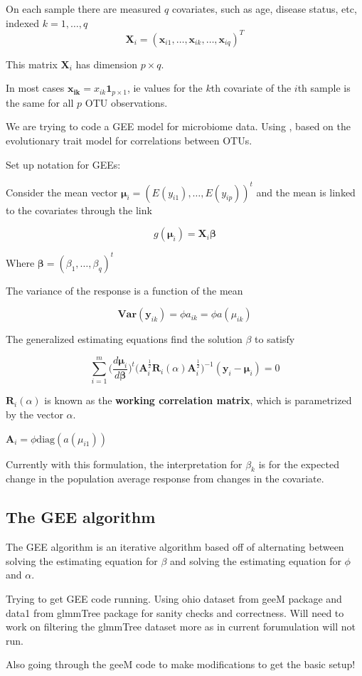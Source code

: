 \documentclass[10pt]{article}
\begin{document}
On each sample there are measured $q$ covariates, such as age, disease status, etc, indexed $k = 1, \ldots, q$
$$\mathbf{X}_i = (\mathbf{x}_{i1}, \ldots, \mathbf{x}_{ik}, \ldots , \mathbf{x}_{iq})^T$$

This matrix $\mathbf{X}_i$ has dimension $p \times q$.

In most cases $\mathbf{x_{ik}} = x_{ik}\boldsymbol{1}_{p \times 1}$, ie values for the $k$th covariate of the $i$th sample is the same for all $p$ OTU observations.


We are trying to code a GEE model for microbiome data. Using \cite{Xiao2018}, based on the evolutionary trait model for correlations between OTUs.


Set up notation for GEEs:

Consider the mean vector $\boldsymbol\mu_i = (E(y_{i1}), \ldots , E(y_{ip}))^t$ and the mean is linked to the covariates through the link

$$g(\boldsymbol\mu_i ) = \mathbf{X}_i \boldsymbol\beta$$

Where $\boldsymbol\beta = (\beta_1 , \ldots , \beta_q)^t$

The variance of the response is a function of the mean

$$\textbf{Var}(\mathbf{y}_{ik}) = \phi a_{ik} = \phi a(\mu_{ik})$$


The generalized estimating equations find the solution $\beta $ to satisfy

$$\sum_{i = 1}^m \bigg(\frac{d \boldsymbol\mu_i}{d \boldsymbol\beta}\bigg)^t \bigg(\mathbf{A}_i^{\frac{1}{2}} \mathbf{R}_i(\alpha) \mathbf{A}_i^{\frac{1}{2}}\bigg)^{-1}(\mathbf{y}_i - \boldsymbol\mu_i) = 0$$


$\mathbf{R}_i(\alpha)$ is known as the \textbf{working correlation matrix}, which is parametrized by the vector $\alpha$.

$\mathbf{A}_i = \phi\text{diag}(a(\mu_{i1}))$


Currently with this formulation, the interpretation for $\beta_k$ is for the expected change in the population average response from changes in the covariate.


\subsection{The GEE algorithm}

The GEE algorithm is an iterative algorithm based off of  alternating between solving the estimating equation for $\beta$ and solving the estimating equation for $\phi$ and $\alpha$.





Trying to get GEE code running. Using ohio dataset from geeM package and data1 from glmmTree package for sanity checks and correctness. Will need to work on filtering the glmmTree dataset more as in current forumulation will not run.

Also going through the geeM code to make modifications to get the basic setup!










\end{document}
